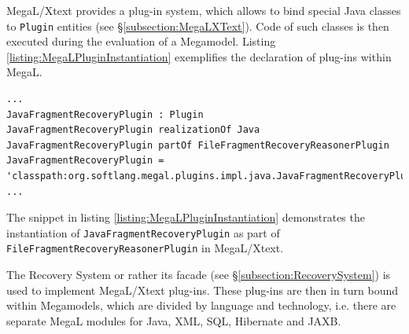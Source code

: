 \gls{MegaL/Xtext} provides a plug-in system, which allows to bind special \gls{Java} classes to \texttt{Plugin} entities (see §\ref{subsection:MegaLXText}).
Code of such classes is then executed during the evaluation of a \gls{Megamodel}.
Listing \ref{listing:MegaLPluginInstantiation} exemplifies the declaration of plug-ins within \gls{MegaL}.
\begin{lstlisting}[caption={MegaL/Xtext Plugin Integration},label={listing:MegaLPluginInstantiation}]
...
JavaFragmentRecoveryPlugin : Plugin
JavaFragmentRecoveryPlugin realizationOf Java
JavaFragmentRecoveryPlugin partOf FileFragmentRecoveryReasonerPlugin
JavaFragmentRecoveryPlugin = 'classpath:org.softlang.megal.plugins.impl.java.JavaFragmentRecoveryPlugin'
...
\end{lstlisting}
The snippet in listing \ref{listing:MegaLPluginInstantiation} demonstrates the instantiation of \texttt{Java\-Frag\-ment\-Re\-co\-very\-Plug\-in} as part of \texttt{File\-Fragment\-Recovery\-Reasoner\-Plugin} in \gls{MegaL/Xtext}.


The Recovery System or rather its facade (see §\ref{subsection:RecoverySystem}) is used to implement \gls{MegaL/Xtext} plug-ins.
These plug-ins are then in turn bound within \glspl{Megamodel}, which are divided by language and technology, i.e. there are separate \gls{MegaL} modules for \gls{Java}, \gls{XML}, \gls{SQL}, \gls{Hibernate} and \gls{JAXB}.
